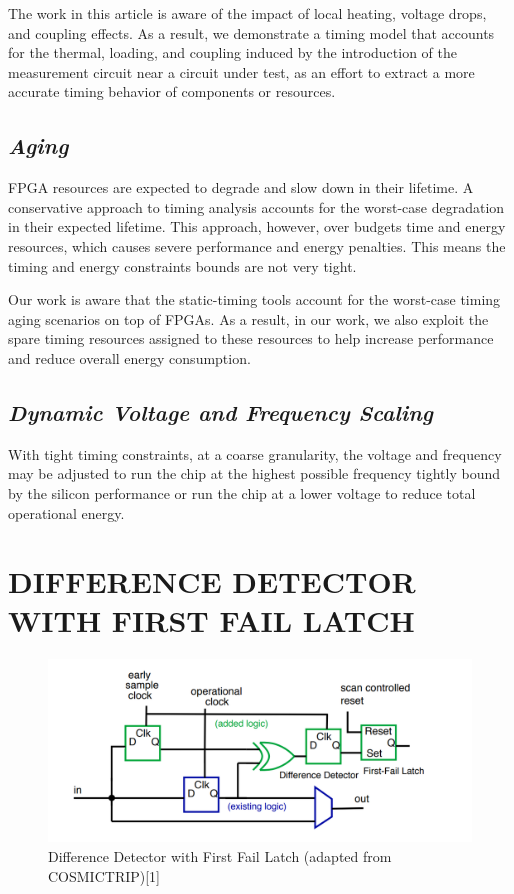 \documentclass[11pt]{report}
\begin{document}
\begin{mainf}
The work in this article is aware of the impact of local heating, voltage drops, and coupling effects. As a result, we demonstrate a timing model that accounts for the thermal, loading, and coupling induced by the introduction of the measurement circuit near a circuit under test, as an effort to extract a more accurate timing behavior of components or resources.  

\subsection{\textit{Aging}}

FPGA resources are expected to degrade and slow down in their lifetime.  A conservative approach to timing analysis accounts for the worst-case degradation in their expected lifetime.  This approach, however, over budgets time and energy resources, which causes severe performance and energy penalties. This means the timing and energy constraints bounds are not very tight. 

Our work is aware that the static-timing tools account for the worst-case timing aging scenarios on top of FPGAs. As a result, in our work, we also exploit the spare timing resources assigned to these resources to help increase performance and reduce overall energy consumption. 

\subsection{\textit{Dynamic Voltage and Frequency Scaling}}
With tight timing constraints, at a coarse granularity, the voltage and frequency may be adjusted to run the chip at the highest possible frequency tightly bound by the silicon performance or run the chip at a lower voltage to reduce total operational energy. 

\section{\textbf{DIFFERENCE DETECTOR WITH FIRST FAIL LATCH}}

\begin{figure}[H]
    \centering
    \includegraphics[width=0.55\linewidth]{ddffl.png}
    \caption{Difference Detector with First Fail Latch (adapted from COSMICTRIP)[1]}
    \label{fig:enter-label}
\end{figure}


\end{mainf}
\end{document}
